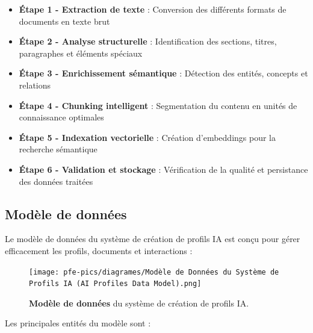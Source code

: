 \begin{itemize}
  \item \textbf{Étape 1 - Extraction de texte} : Conversion des différents formats de documents en texte brut
  
  \item \textbf{Étape 2 - Analyse structurelle} : Identification des sections, titres, paragraphes et éléments spéciaux
  
  \item \textbf{Étape 3 - Enrichissement sémantique} : Détection des entités, concepts et relations
  
  \item \textbf{Étape 4 - Chunking intelligent} : Segmentation du contenu en unités de connaissance optimales
  
  \item \textbf{Étape 5 - Indexation vectorielle} : Création d'embeddings pour la recherche sémantique
  
  \item \textbf{Étape 6 - Validation et stockage} : Vérification de la qualité et persistance des données traitées
\end{itemize}

\subsection{Modèle de données}

Le modèle de données du système de création de profils IA est conçu pour gérer efficacement les profils, documents et interactions :

\begin{figure}[H]
  \centering
  \texttt{[image: pfe-pics/diagrames/Modèle de Données du Système de Profils IA (AI Profiles Data Model).png]}
  \caption{\textbf{Modèle de données} du système de création de profils IA.}
  \label{fig:ai_data_model}
\end{figure}

Les principales entités du modèle sont :

